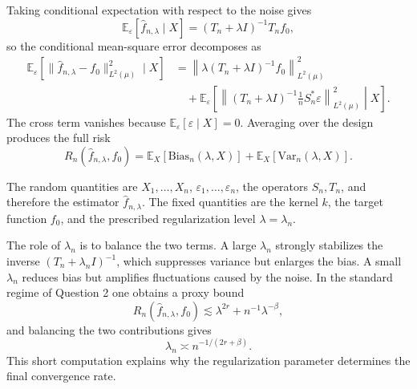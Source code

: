 \documentclass[11pt,en]{elegantpaper}
\newcommand{\E}{\mathbb{E}}
\begin{document}
Taking conditional expectation with respect to the noise gives
\[
\E_\varepsilon[\hat f_{n,\lambda}\mid X]
=(T_n+\lambda I)^{-1}T_n f_0,
\]
so the conditional mean-square error decomposes as
\begin{align*}
\E_\varepsilon\!\left[\|\hat f_{n,\lambda}-f_0\|_{L^2(\mu)}^2\mid X\right]
&=
\left\|\lambda (T_n+\lambda I)^{-1}f_0\right\|_{L^2(\mu)}^2 \\
&\quad +
\E_\varepsilon\!\left[
\left\|(T_n+\lambda I)^{-1}\frac{1}{n}S_n^\ast \varepsilon\right\|_{L^2(\mu)}^2
\middle| X
\right].
\end{align*}
The cross term vanishes because \(\E_\varepsilon[\varepsilon\mid X]=0\). Averaging over
the design produces the full risk
\[
R_n(\hat f_{n,\lambda},f_0)=\E_X[\mathrm{Bias}_n(\lambda,X)]
+\E_X[\mathrm{Var}_n(\lambda,X)].
\]

The random quantities are \(X_1,\dots,X_n\), \(\varepsilon_1,\dots,\varepsilon_n\),
the operators \(S_n,T_n\), and therefore the estimator \(\hat f_{n,\lambda}\). The
fixed quantities are the kernel \(k\), the target function \(f_0\), and the prescribed
regularization level \(\lambda=\lambda_n\).

The role of \(\lambda_n\) is to balance the two terms. A large \(\lambda_n\) strongly
stabilizes the inverse \((T_n+\lambda_n I)^{-1}\), which suppresses variance but enlarges
the bias. A small \(\lambda_n\) reduces bias but amplifies fluctuations caused by the
noise. In the standard regime of Question 2 one obtains a proxy bound
\[
R_n(\hat f_{n,\lambda},f_0)\lesssim \lambda^{2r}+n^{-1}\lambda^{-\beta},
\]
and balancing the two contributions gives
\[
\lambda_n\asymp n^{-1/(2r+\beta)}.
\]
This short computation explains why the regularization parameter determines the final
convergence rate.
\end{document}
